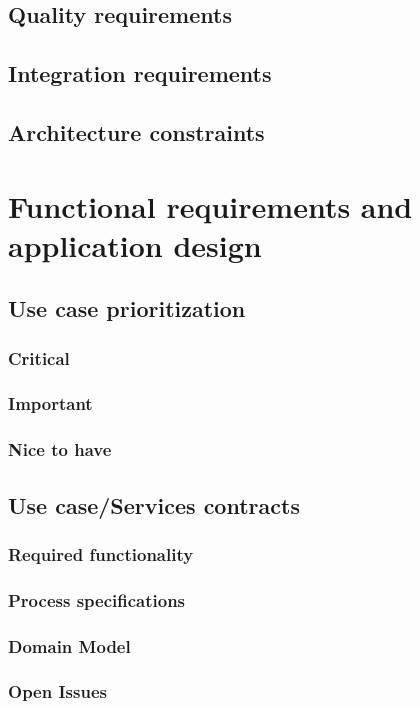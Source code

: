 \documentclass[a4paper, 10pt, oneside]{report}
\begin{document}
	\section{Quality requirements}
	\section{Integration requirements}
	\section{Architecture constraints}

\chapter{ Functional requirements and application design}
	\section{Use case prioritization}
		\subsection{Critical}
		\subsection{Important}
		\subsection{Nice to have}
	\section{Use case/Services contracts}

\newpage

\newpage

\newpage

\newpage

\newpage

\newpage

\newpage

\newpage

\newpage

\newpage

\newpage

\subsection{Required functionality}
\subsection{Process specifications}
\subsection{Domain Model}
\subsection{Open Issues}
\end{document}

